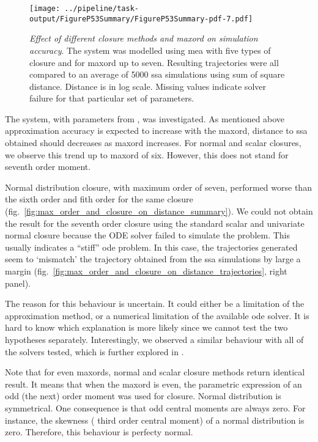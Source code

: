 \begin{figure}[t]
    \centering
    \texttt{[image: ../pipeline/task-output/FigureP53Summary/FigureP53Summary-pdf-7.pdf]}
    \caption{\emph{Effect of different closure methods and \gls{maxord} on simulation accuracy}. The \pft{} system was modelled using \gls{mea} with five types of closure and for \gls{maxord} up to seven.
Resulting trajectories were all compared to an average of 5000 \gls{ssa} simulations using sum of square distance.
Distance is in log scale. Missing values indicate solver failure for that particular set of parameters.}
    \label{fig:max_order_and_closure_on_distance_summary}
\end{figure}

The \pft{} system, with parameters from \cite{ale_general_2013}, was investigated.
As mentioned above approximation accuracy is expected to increase with the \gls{maxord}, \ie{} distance to \gls{ssa} obtained should decreases
 as \gls{maxord} increases.
For normal and scalar closures, we observe this trend up to \gls{maxord} of six.
However, this does not stand for seventh order moment.

Normal distribution closure, with maximum order of seven, performed worse than the sixth order and fith order for the same closure (fig.~\autoref{fig:max_order_and_closure_on_distance_summary}).
We could not obtain the result for the seventh order closure using the standard scalar and univariate normal closure
because the ODE solver failed to simulate the problem.
This usually indicates a ``stiff'' \gls{ode} problem.
In this case, the trajectories generated seem to `mismatch' the trajectory obtained from the \gls{ssa} simulations by
large a margin (fig.~\autoref{fig:max_order_and_closure_on_distance_trajectories}, right panel).

The reason for this behaviour is uncertain. It could either be a limitation of the approximation method, or a numerical limitation of the available \gls{ode} solver.
It is hard to know which explanation is more likely since we cannot test the two hypotheses separately.
Interestingly, we observed a similar behaviour with all of the solvers tested, which is further explored in .

Note that for even \gls{maxord}s, normal and scalar closure methods return identical result.
It means that when the \gls{maxord} is even,  the parametric expression of an odd (the next) order moment was used for closure.
Normal distribution is symmetrical. One consequence is that odd central moments are always zero.
For instance, the skewness (\ie{} third order central moment) of a normal distribution is zero.
Therefore, this behaviour is perfecty normal.


